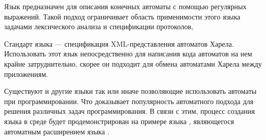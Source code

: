 Язык  предназначен для описания конечных автоматы с помощью регулярных выражений. Такой подход ограничивает 
область применимости этого языка задачами лексического анализа и спецификации протоколов,

Стандарт языка  --- спецификация XML-представления автоматов Харела. %
Использовать этот язык 
непосредственно для написания кода автоматов на нем крайне затруднительно, скорее он подходит для обмена автоматами Харела
между приложениям.

Существуют и другие языки так или иначе позволяющие использовать автоматы при программировании. Что доказывает популярность
автоматного подхода для решения различных задач программирования. В связи с этим, процесс создания языка в среде \MPS{}
будет продемонстрирован на примере языка , являющегося автоматным расширением
языка .

